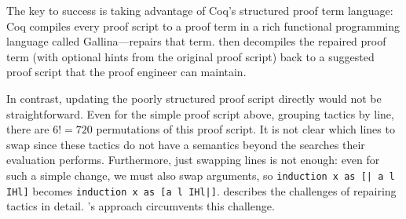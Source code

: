 The key to success is taking advantage of Coq's structured proof term language:
Coq compiles every proof script to a proof term in a rich functional programming language called 
Gallina---\toolname repairs that term.
\toolname then decompiles the repaired proof term (with optional hints from the original proof script) back 
to a suggested proof script that the proof engineer can maintain.

In contrast, updating the poorly structured proof script directly would not be straightforward.
Even for the simple proof script above, grouping tactics by line, there are $6! = 720$ permutations of this proof script.
It is not clear which lines to swap since these tactics do not have a semantics beyond the searches their evaluation performs.
Furthermore, just swapping lines is not enough: even for such a simple change, we must also swap
arguments, so \lstinline{induction x as [| a l IHl]} becomes \lstinline{induction x as [a l IHl|]}.
\citet{robert2018} describes the challenges of repairing tactics in detail.
\toolname's approach circumvents this challenge.




